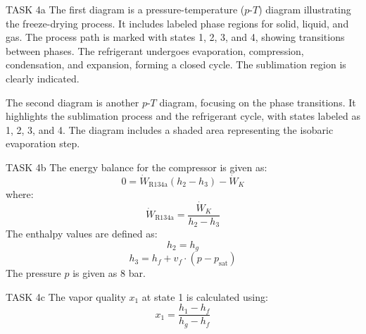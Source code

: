 TASK 4a  
The first diagram is a pressure-temperature (\(p\)-\(T\)) diagram illustrating the freeze-drying process. It includes labeled phase regions for solid, liquid, and gas. The process path is marked with states 1, 2, 3, and 4, showing transitions between phases. The refrigerant undergoes evaporation, compression, condensation, and expansion, forming a closed cycle. The sublimation region is clearly indicated.

The second diagram is another \(p\)-\(T\) diagram, focusing on the phase transitions. It highlights the sublimation process and the refrigerant cycle, with states labeled as 1, 2, 3, and 4. The diagram includes a shaded area representing the isobaric evaporation step.

TASK 4b  
The energy balance for the compressor is given as:  
\[
0 = \dot{W}_{\text{R134a}} (h_2 - h_3) - \dot{W}_K
\]  
where:  
\[
\dot{W}_{\text{R134a}} = \frac{\dot{W}_K}{h_2 - h_3}
\]  
The enthalpy values are defined as:  
\[
h_2 = h_g
\]  
\[
h_3 = h_f + v_f \cdot (p - p_{\text{sat}})
\]  
The pressure \(p\) is given as 8 bar.

TASK 4c  
The vapor quality \(x_1\) at state 1 is calculated using:  
\[
x_1 = \frac{h_1 - h_f}{h_g - h_f}
\]